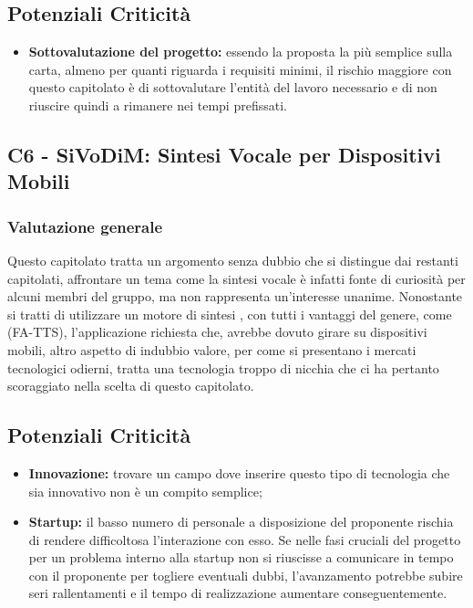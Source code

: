 \subsection{Potenziali Criticità}

\begin{itemize}
	\item \textbf{Sottovalutazione del progetto:} essendo la proposta la più semplice sulla carta, almeno per quanti riguarda i requisiti minimi, il rischio maggiore con questo capitolato è di sottovalutare l'entità del lavoro necessario e di non riuscire quindi a rimanere nei tempi prefissati.
\end{itemize}


\subsection{C6 - SiVoDiM: Sintesi Vocale per Dispositivi Mobili}
\subsubsection{Valutazione generale}
Questo capitolato tratta un argomento senza dubbio che si distingue dai restanti capitolati, affrontare un tema come la sintesi vocale \`e infatti fonte di curiosit\`a per alcuni membri del gruppo, ma non rappresenta un'interesse unanime.
Nonostante si tratti di utilizzare un motore di sintesi , con tutti i vantaggi del genere, come  (FA-TTS), l'applicazione richiesta che, avrebbe dovuto girare su dispositivi mobili, altro aspetto di indubbio valore, per come si presentano i mercati tecnologici odierni, tratta una tecnologia troppo di nicchia che ci ha pertanto scoraggiato nella scelta di questo capitolato.

\subsection{Potenziali Criticità}

\begin{itemize}
	\item \textbf{Innovazione:} trovare un campo dove inserire questo tipo di tecnologia che sia innovativo non è un compito semplice;
\end{itemize}

\begin{itemize}
	\item \textbf{Startup:} il basso numero di personale a disposizione del proponente rischia di rendere difficoltosa l'interazione con esso. Se nelle fasi cruciali del progetto per un problema interno alla startup non si riuscisse a comunicare in tempo con il proponente per togliere eventuali dubbi, l'avanzamento potrebbe subire seri rallentamenti e il tempo di realizzazione aumentare conseguentemente.
\end{itemize}
